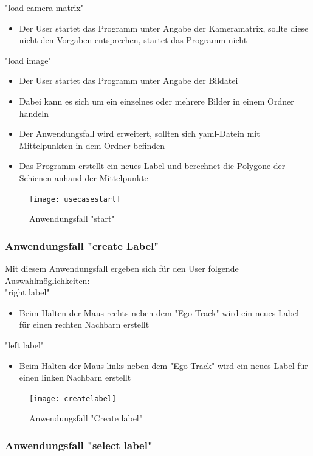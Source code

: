 \documentclass[11pt]{scrartcl}
\begin{document}
\noindent
"load camera matrix"
\begin{itemize}
	\item Der User startet das Programm unter Angabe der Kameramatrix, sollte diese nicht den Vorgaben entsprechen, startet das Programm nicht
\end{itemize}
"load image"
\begin{itemize}
	\item Der User startet das Programm unter Angabe der Bildatei
	\item Dabei kann es sich um ein einzelnes oder mehrere Bilder in einem Ordner handeln
	\item Der Anwendungsfall wird erweitert, sollten sich yaml-Datein mit Mittelpunkten in dem Ordner befinden
	\item Das Programm erstellt ein neues Label und berechnet die Polygone der Schienen anhand der Mittelpunkte
\end{itemize}
\begin{figure}[H]
  \texttt{[image: usecasestart]}
  \caption{Anwendungsfall "start"}
\end{figure}

\subsubsection{Anwendungsfall "create Label"}
\label{sec:Anwendungsfall "create Label"}

Mit diesem Anwendungsfall ergeben sich für den User folgende Auswahlmöglichkeiten:
\\

\noindent
"right label"
\begin{itemize}
	\item Beim Halten der Maus rechts neben dem "Ego Track" wird ein neues Label für einen rechten Nachbarn erstellt
\end{itemize}
"left label"
\begin{itemize}
	\item Beim Halten der Maus links neben dem "Ego Track" wird ein neues Label für einen linken Nachbarn erstellt
\end{itemize}
\begin{figure}[H]
  \texttt{[image: createlabel]}
  \caption{Anwendungsfall "Create label"}
\end{figure}

\subsubsection{Anwendungsfall "select label"}
\label{sec:Anwendungsfall "select label"l}
\end{document}
